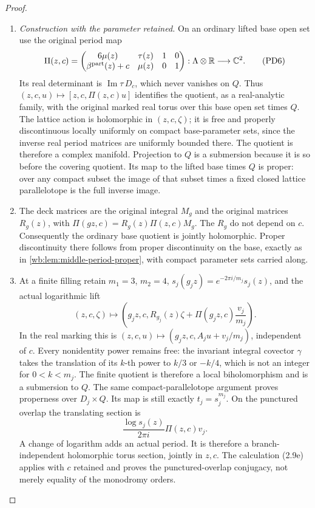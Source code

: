\begin{proof}
\begin{enumerate}[label=\arabic*.,leftmargin=*]
\item \emph{Construction with the parameter retained.}
On an ordinary lifted base open set use the original period map
\[
 \Pi(z,c)=
 \begin{pmatrix}
 6\mu(z)&\tau(z)&1&0\\
 \beta^{\rm part}(z)+c&\mu(z)&0&1
 \end{pmatrix}:
 \Lambda\otimes\mathbb R\longrightarrow\mathbb C^2.
 \tag{PD6}
\]
Its real determinant is $\operatorname{Im}\tau\,D_c$, which never
vanishes on $Q$. Thus $(z,c,u)\mapsto[z,c,\Pi(z,c)u]$ identifies the
quotient, as a real-analytic family, with the original marked real torus
over this base open set times $Q$. The lattice action is holomorphic in
$(z,c,\zeta)$; it is free and properly discontinuous locally uniformly
on compact base-parameter sets, since the inverse real period matrices
are uniformly bounded there. The quotient is therefore a complex
manifold. Projection to $Q$ is a submersion because it is so before
the covering quotient. Its map to the lifted base times $Q$ is proper:
over any compact subset the image of that subset times a fixed closed
lattice parallelotope is the full inverse image.

\item The deck matrices are the original integral $M_g$ and the original
matrices $R_g(z)$, with
$\Pi(gz,c)=R_g(z)\Pi(z,c)M_g$. The $R_g$ do not depend on $c$.
Consequently the ordinary base quotient is jointly holomorphic.
Proper discontinuity there follows from proper discontinuity on the
base, exactly as in \cref{wb:lem:middle-period-proper}, with compact
parameter sets carried along.

\item At a finite filling retain $m_1=3$, $m_2=4$,
$s_j(g_jz)=e^{-2\pi i/m_j}s_j(z)$, and the actual logarithmic lift
\[
 (z,c,\zeta)\longmapsto
 \left(g_jz,c,R_{g_j}(z)\zeta+
                  \Pi(g_jz,c)\frac{v_j}{m_j}\right).
 \tag{PD7}
\]
In the real marking this is $(z,c,u)\mapsto
(g_jz,c,A_ju+v_j/m_j)$, independent of $c$.
Every nonidentity power remains free: the invariant integral covector
$\gamma$ takes the translation of its $k$-th power to $k/3$ or $-k/4$,
which is not an integer for $0<k<m_j$.
The finite quotient is therefore a local biholomorphism and is a
submersion to $Q$. The same compact-parallelotope argument proves
properness over $D_j\times Q$. Its map is still exactly
$t_j=s_j^{m_j}$. On the punctured overlap the translating section is
\[
 \frac{\log s_j(z)}{2\pi i}\Pi(z,c)v_j.
 \tag{PD8}
\]
A change of logarithm adds an actual period. It is therefore a
branch-independent holomorphic torus section, jointly in $z,c$.
The calculation (2.9e) applies with $c$ retained and proves the
punctured-overlap conjugacy, not merely equality of the monodromy orders.


\end{enumerate}
\end{proof}
